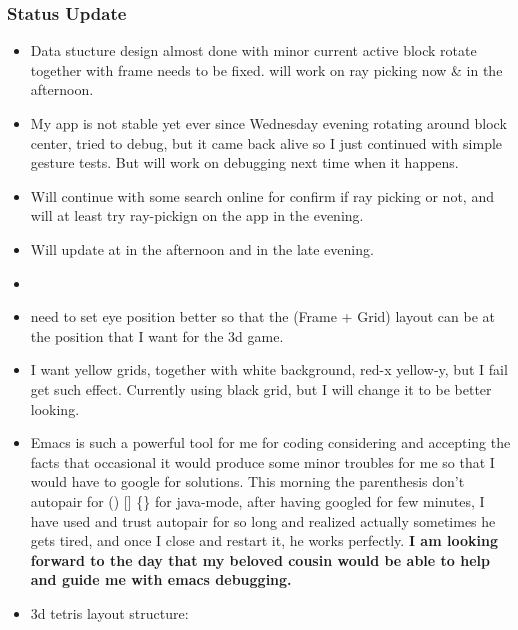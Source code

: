 \documentclass[9pt,b5paper]{article}
\begin{document}
\subsubsection{Status Update}
\label{sec-1-1-2}
\begin{itemize}
\item Data stucture design almost done with minor current active block rotate together with frame needs to be fixed. will work on ray picking now \& in the afternoon.
\item My app is not stable yet ever since Wednesday evening rotating around block center, tried to debug, but it came back alive so I just continued with simple gesture tests. But will work on debugging next time when it happens.
\item Will continue with some search online for confirm if ray picking or not, and will at least try ray-pickign on the app in the evening.
\item Will update at in the afternoon and in the late evening.
\item 
\item need to set eye position better so that the (Frame + Grid) layout can be at the position that I want for the 3d game.
\item I want yellow grids, together with white background, red-x yellow-y, but I fail get such effect. Currently using black grid, but I will change it to be better looking.
\item Emacs is such a powerful tool for me for coding considering and accepting the facts that occasional it would produce some minor troubles for me so that I would have to google for solutions. This morning the parenthesis don't autopair for () [] \{\} for java-mode, after having googled for few minutes, I have used and trust autopair for so long and realized actually sometimes he gets tired, and once I close and restart it, he works perfectly. \textbf{I am looking forward to the day that my beloved cousin would be able to help and guide me with emacs debugging.}
\item 3d tetris layout structure: 


\end{itemize}
\end{document}
